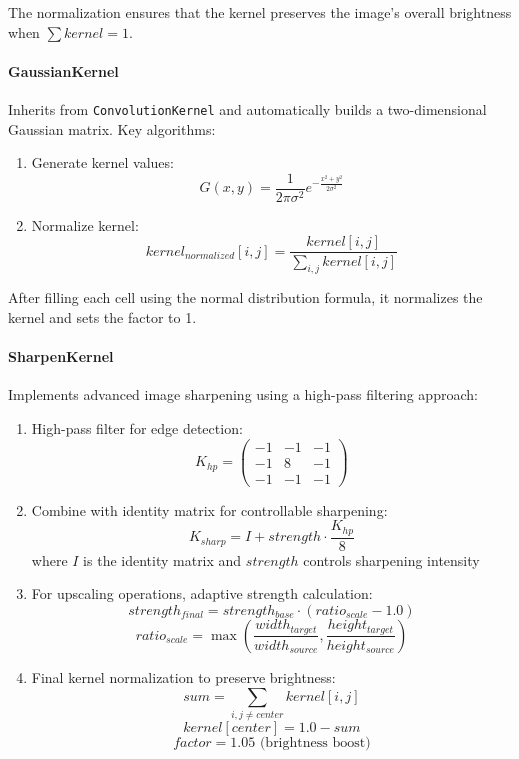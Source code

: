 \documentclass[12pt,a4paper]{report}
\begin{document}
The normalization ensures that the kernel preserves the image's overall brightness when $\sum kernel = 1$.

\paragraph{GaussianKernel}
Inherits from \texttt{ConvolutionKernel} and automatically builds a two-dimensional Gaussian matrix. Key algorithms:
\begin{enumerate}
    \item Generate kernel values:
    \[ G(x,y) = \frac{1}{2\pi\sigma^2} e^{-\frac{x^2 + y^2}{2\sigma^2}} \]
    
    \item Normalize kernel:
    \[ kernel_{normalized}[i,j] = \frac{kernel[i,j]}{\sum_{i,j} kernel[i,j]} \]
\end{enumerate}

After filling each cell using the normal distribution formula, it normalizes the kernel and sets the factor to 1.

\paragraph{SharpenKernel}
Implements advanced image sharpening using a high-pass filtering approach:
\begin{enumerate}
    \item High-pass filter for edge detection:
    \[ K_{hp} = \begin{pmatrix} 
    -1 & -1 & -1 \\
    -1 & 8 & -1 \\
    -1 & -1 & -1
    \end{pmatrix} \]
    
    \item Combine with identity matrix for controllable sharpening:
    \[ K_{sharp} = I + strength \cdot \frac{K_{hp}}{8} \]
    where $I$ is the identity matrix and $strength$ controls sharpening intensity
    
    \item For upscaling operations, adaptive strength calculation:
    \[ strength_{final} = strength_{base} \cdot (ratio_{scale} - 1.0) \]
    \[ ratio_{scale} = \max(\frac{width_{target}}{width_{source}}, \frac{height_{target}}{height_{source}}) \]
    
    \item Final kernel normalization to preserve brightness:
    \[ sum = \sum_{i,j \neq center} kernel[i,j] \]
    \[ kernel[center] = 1.0 - sum \]
    \[ factor = 1.05 \text{ (brightness boost)} \]
\end{enumerate}
\end{document}
